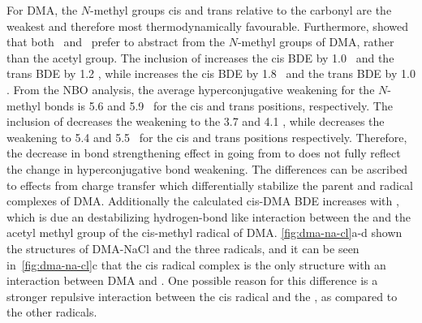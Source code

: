 For DMA, the $N$-methyl groups cis and trans relative to the carbonyl are the weakest and therefore most thermodynamically favourable. Furthermore, \citet{Salamone2013} showed that both \bno\ and \cumo\ prefer to abstract from the $N$-methyl groups of DMA, rather than the acetyl group. The inclusion of  increases the cis BDE by 1.0 \kcalmol\ and the trans BDE by 1.2 \kcalmol, while  increases the cis BDE by 1.8 \kcalmol\ and the trans BDE by 1.0 \kcalmol. From the NBO analysis, the average hyperconjugative weakening for the $N$-methyl  bonds is 5.6 and 5.9 \kcalmol\ for the cis and trans positions, respectively. The inclusion of  decreases the weakening to the 3.7 and 4.1 \kcalmol, while  decreases the weakening to 5.4 and 5.5 \kcalmol\ for the cis and trans positions respectively. Therefore, the decrease in bond strengthening effect in going from  to  does not fully reflect the change in hyperconjugative bond weakening. The differences can be ascribed to effects from charge transfer which differentially stabilize the parent and radical complexes of DMA. Additionally the calculated cis-DMA BDE increases with , which is due an destabilizing hydrogen-bond like interaction between the  and the acetyl methyl group of the cis-methyl radical of DMA. \ref{fig:dma-na-cl}a-d shown the structures of DMA-NaCl and the three radicals, and it can be seen in~\ref{fig:dma-na-cl}c that the cis radical complex is the only structure with an interaction between DMA and . One possible reason for this difference is a stronger repulsive interaction between the cis radical and the , as compared to the other radicals.

